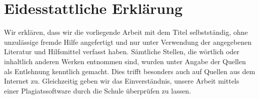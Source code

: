\documentclass[headings=small,a4paper, 12pt]{scrreprt}
\begin{document}
\glsenablehyper
\hypersetup{pageanchor=true}


\tableofcontents


%














\printglossary
\printglossary[type=\acronymtype, title=Abkürzungsverzeichnis]






\printbibliography[filter = literat, heading=bibliography, title={Literaturverzeichnis}]

\printbibliography[filter = internet, heading=bibliography, title={Internetquellen}]

\listoffigures %

	


\chapter*{Eidesstattliche Erklärung}
Wir erklären, dass wir die vorliegende Arbeit mit dem Titel  selbstständig, ohne unzulässige fremde Hilfe angefertigt und nur unter Verwendung der angegebenen Literatur und Hilfsmittel verfasst haben. 
Sämtliche Stellen, die wörtlich oder inhaltlich anderen Werken entnommen sind, wurden unter Angabe der Quellen als Entlehnung kenntlich gemacht. 
Dies trifft besonders auch auf Quellen aus dem Internet zu. Gleichzeitig geben wir das Einverständnis, unsere Arbeit mittels einer Plagiatssoftware durch die Schule überprüfen zu lassen.
\end{document}
